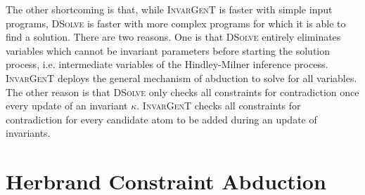 \documentclass{article}
\newcommand{\tmname}[1]{\textsc{#1}}
\begin{document}
The other shortcoming is that, while {\tmname{InvarGenT}} is faster with
simple input programs, {\tmname{DSolve}} is faster with more complex programs
for which it is able to find a solution. There are two reasons. One is that
{\tmname{DSolve}} entirely eliminates variables which cannot be invariant
parameters before starting the solution process, i.e. intermediate variables
of the Hindley-Milner inference process. {\tmname{InvarGenT}} deploys the
general mechanism of abduction to solve for all variables. The other reason is
that {\tmname{DSolve}} only checks all constraints for contradiction once
every update of an invariant $\kappa$. {\tmname{InvarGenT}} checks all
constraints for contradiction for every candidate atom to be added during an
update of invariants.

\section{Herbrand Constraint Abduction}\label{HerbSection}
\end{document}
